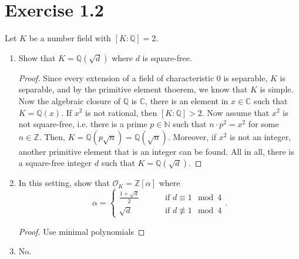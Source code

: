 \documentclass[a4paper]{article}
\begin{document}
\section*{Exercise 1.2}
Let \(K\) be a number field with \([K:\mathbb{Q}] = 2\).
\begin{enumerate}
  \item Show that \(K = \mathbb{Q}(\sqrt{d})\) where \(d\) is square-free.
  \begin{proof}
    Since every extension of a field of characteristic \(0\) is separable, \(K\) is separable, and by the primitive element thoerem, we know that \(K\) is simple. Now the algebraic closure of \(\mathbb{Q}\) is \(\mathbb{C}\), there is an element in \(x \in \mathbb{C}\) such that \(K = \mathbb{Q}(x)\). If \(x^2\) is not rational, then \([K : \mathbb{Q}] > 2\). Now assume that \(x^2\) is not square-free, i.e. there is a prime \(p \in \mathbb{N}\) such that \(n \cdot p^2 = x^2\) for some \(n \in \mathbb{Z}\). Then, \(K = \mathbb{Q}(p \sqrt{n}) = \mathbb{Q}(\sqrt{n})\). Moreover, if \(x^2\) is not an integer, another primitive element that is an integer can be found. All in all, there is a square-free integer \(d\) such that \(K = \mathbb{Q}(\sqrt{d})\).
  \end{proof}
  \item In this setting, show that \(\mathcal{O}_K = \mathbb{Z}[\alpha]\) where
  \begin{equation}
    \alpha = \begin{cases}
      \frac{1+\sqrt{d}}{2} &\qquad \text{ if } d \equiv 1 \mod{4}\\
      \sqrt{d} &\qquad \text{ if } d \not\equiv 1 \mod{4}
    \end{cases} \text{.}
  \end{equation}
  \begin{proof}
    Use minimal polynomials
  \end{proof}
  \item No.
\end{enumerate}
\newpage
\end{document}

